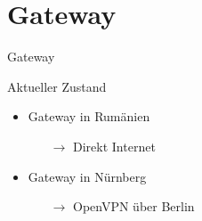 \section{Gateway}


\begin{frame}{Gateway}
    \begin{block}{Aktueller Zustand}
        \begin{itemize}
            \item Gateway in Rumänien
            \begin{itemize}
                \item[$\rightarrow$] Direkt Internet
            \end{itemize}
            \item Gateway in Nürnberg
            \begin{itemize}
                \item[$\rightarrow$] OpenVPN über Berlin
            \end{itemize}
        \end{itemize}
    \end{block}
\end{frame}
